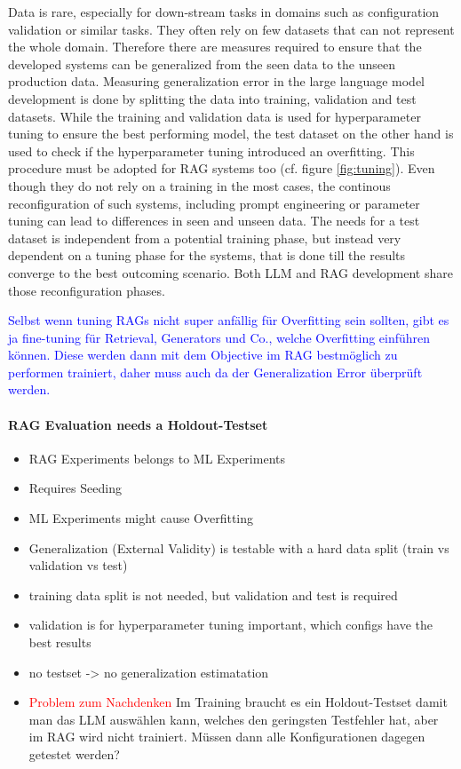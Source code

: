 Data is rare, especially for down-stream tasks in domains such as configuration validation or similar tasks. They often rely on few datasets that can not represent the whole domain. Therefore there are measures required to ensure that the developed systems can be generalized from the seen data to the unseen production data. Measuring generalization error in the large language model development is done by splitting the data into training, validation and test datasets. While the training and validation data is used for hyperparameter tuning to ensure the best performing model, the test dataset on the other hand is used to check if the hyperparameter tuning introduced an overfitting. This procedure must be adopted for RAG systems too (cf. figure \ref{fig:tuning}). Even though they do not rely on a training in the most cases, the continous reconfiguration of such systems, including prompt engineering or parameter tuning can lead to differences in seen and unseen data. The needs for a test dataset is independent from a potential training phase, but instead very dependent on a tuning phase for the systems, that is done till the results converge to the best outcoming scenario. Both LLM and RAG development share those reconfiguration phases. 

\textcolor{blue}{Selbst wenn tuning RAGs nicht super anfällig für Overfitting sein sollten, gibt es ja fine-tuning für Retrieval, Generators und Co., welche Overfitting einführen können. Diese werden dann mit dem Objective im RAG bestmöglich zu performen trainiert, daher muss auch da der Generalization Error überprüft werden.}

\paragraph{RAG Evaluation needs a Holdout-Testset}
\begin{itemize}
    \item RAG Experiments belongs to ML Experiments 
    \item Requires Seeding
    \item ML Experiments might cause Overfitting
    \item Generalization (External Validity) is testable with a hard data split (train vs validation vs test)
    \item training data split is not needed, but validation and test is required
    \item validation is for hyperparameter tuning important, which configs have the best results
    \item no testset -> no generalization estimatation
    \item \textcolor{red}{Problem zum Nachdenken} Im Training braucht es ein Holdout-Testset damit man das LLM auswählen kann, welches den geringsten Testfehler hat, aber im RAG wird nicht trainiert. Müssen dann alle Konfigurationen dagegen getestet werden?
\end{itemize}


